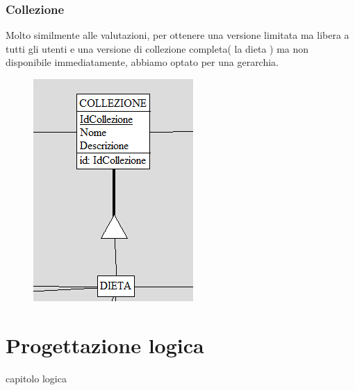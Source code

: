 ﻿\documentclass[a4paper,12pt]{report}
\begin{document}
\subsection{Collezione}
Molto similmente alle valutazioni, per ottenere una versione limitata
ma libera a tutti gli utenti e una versione di collezione completa( la dieta )
ma non disponibile immediatamente, abbiamo optato per una gerarchia.
\begin{figure}[H]
    \centering
    \includegraphics[width=0.6\linewidth]{app_images/collezione-concettuale.png}
\end{figure}
\chapter{Progettazione logica}
capitolo logica
\end{document}

